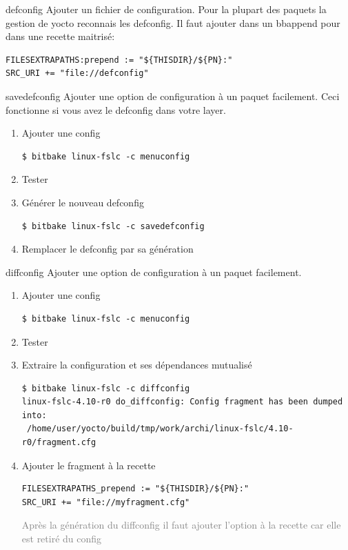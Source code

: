 \documentclass[compress]{beamer}
\begin{document}
\begin{frame}[fragile]{defconfig}
Ajouter un fichier de configuration.\newline
\newline
Pour la plupart des paquets la gestion de yocto reconnais les defconfig. Il faut ajouter dans un bbappend pour dans une recette maitrisé:
\begin{lstlisting}[style=shell]
FILESEXTRAPATHS:prepend := "${THISDIR}/${PN}:"
SRC_URI += "file://defconfig"
\end{lstlisting}
\end{frame}

\begin{frame}[fragile]{savedefconfig}
Ajouter une option de configuration à un paquet facilement.\newline
\newline
Ceci fonctionne si vous avez le defconfig dans votre layer.
\begin{enumerate}
\item Ajouter une config
\begin{lstlisting}[style=shell]
$ bitbake linux-fslc -c menuconfig
\end{lstlisting}
\item Tester
\item Générer le nouveau defconfig
\begin{lstlisting}[style=shell]
$ bitbake linux-fslc -c savedefconfig
\end{lstlisting}
\item Remplacer le defconfig par sa génération
\end{enumerate}
\end{frame}

\begin{frame}[fragile]{diffconfig}
Ajouter une option de configuration à un paquet facilement.
\begin{enumerate}
\item Ajouter une config
\begin{lstlisting}[style=shell]
$ bitbake linux-fslc -c menuconfig
\end{lstlisting}
\item Tester
\item Extraire la configuration et ses dépendances mutualisé
\begin{lstlisting}[style=shell]
$ bitbake linux-fslc -c diffconfig
linux-fslc-4.10-r0 do_diffconfig: Config fragment has been dumped into:
 /home/user/yocto/build/tmp/work/archi/linux-fslc/4.10-r0/fragment.cfg
\end{lstlisting}
\item Ajouter le fragment à la recette
\begin{lstlisting}[style=shell]
FILESEXTRAPATHS_prepend := "${THISDIR}/${PN}:"
SRC_URI += "file://myfragment.cfg"
\end{lstlisting}
\textcolor{gray}{\tiny{Après la génération du diffconfig il faut ajouter l'option à la recette car elle est retiré du config}}
\end{enumerate}
\end{frame}
\end{document}
